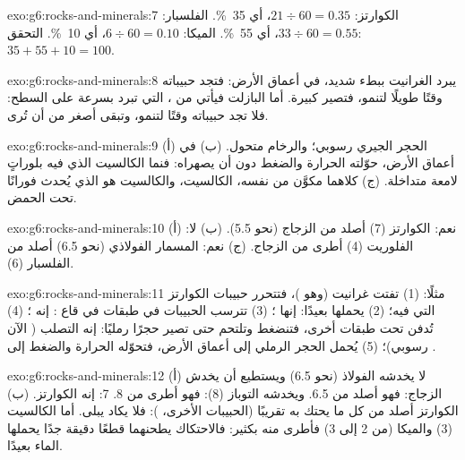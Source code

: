 \begin{solution}{exo:g6:rocks-and-minerals:7}
الكوارتز: $21 \div 60 = 0.35$، أي 35~\%. الفلسبار: $33 \div 60 = 0.55$،
أي 55~\%. الميكا: $6 \div 60 = 0.10$، أي 10~\%. التحقق:
$35 + 55 + 10 = 100$.
\end{solution}

\begin{solution}{exo:g6:rocks-and-minerals:8}
يبرد الغرانيت ببطء شديد، في أعماق الأرض: فتجد حبيباته وقتًا طويلًا لتنمو،
فتصير كبيرة. أما البازلت فيأتي من ، التي تبرد بسرعة على السطح: فلا تجد
حبيباته وقتًا لتنمو، وتبقى أصغر من أن تُرى.
\end{solution}

\begin{solution}{exo:g6:rocks-and-minerals:9}
(أ) الحجر الجيري رسوبي؛ والرخام متحول. (ب) في أعماق الأرض، حوّلته الحرارة
والضغط دون أن يصهراه: فنما الكالسيت الذي فيه بلوراتٍ لامعة متداخلة.
(ج) كلاهما مكوَّن من  نفسه، الكالسيت، والكالسيت هو الذي يُحدث
فورانًا تحت الحمض.
\end{solution}

\begin{solution}{exo:g6:rocks-and-minerals:10}
(أ) نعم: الكوارتز (7) أصلد من الزجاج (نحو 5.5). (ب) لا: الفلوريت (4)
أطرى من الزجاج. (ج) نعم: المسمار الفولاذي (نحو 6.5) أصلد من
الفلسبار (6).
\end{solution}

\begin{solution}{exo:g6:rocks-and-minerals:11}
مثلًا: (1) تفتت  غرانيت  (وهو )، فتتحرر حبيبات
الكوارتز التي فيه؛ (2) يحملها  بعيدًا: إنها ؛ (3) تترسب
الحبيبات في طبقات في قاع : إنه ؛ (4) تُدفن تحت طبقات أخرى،
فتنضغط وتلتحم حتى تصير حجرًا رمليًا: إنه التصلب ( الآن رسوبي)؛
(5) يُحمل الحجر الرملي إلى أعماق الأرض، فتحوّله الحرارة والضغط
إلى .
\end{solution}

\begin{solution}{exo:g6:rocks-and-minerals:12}
(أ) لا يخدشه الفولاذ (نحو 6.5) ويستطيع أن يخدش الزجاج: فهو أصلد
من 6.5. ويخدشه التوباز (8): فهو أطرى من 8.  7: إنه
الكوارتز. (ب) الكوارتز أصلد من كل ما يحتك به تقريبًا
(الحبيبات الأخرى، ): فلا يكاد يبلى. أما الكالسيت (3) والميكا
(من 2 إلى 3) فأطرى منه بكثير: فالاحتكاك يطحنهما قطعًا دقيقة جدًا
يحملها الماء بعيدًا.
\end{solution}

